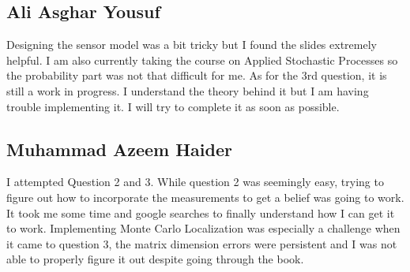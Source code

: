 \documentclass[answers]{exam}
\begin{document}
\begin{questions}
\begin{parts}
\begin{solution}
            \subsection*{Ali Asghar Yousuf}
            Designing the sensor model was a bit tricky but I found the slides extremely
            helpful. I am also currently taking the course on Applied Stochastic Processes
            so the probability part was not that difficult for me. As for the 3rd question,
            it is still a work in progress. I understand the theory behind it but I am
            having trouble implementing it. I will try to complete it as soon as possible.

            \subsection*{Muhammad Azeem Haider}
            I attempted Question 2 and 3. While question 2 was seemingly easy, trying to
            figure out how to incorporate the measurements to get a belief was going to
            work. It took me some time and google searches to finally understand how I can
            get it to work. Implementing Monte Carlo Localization was especially a
            challenge when it came to question 3, the matrix dimension errors were
            persistent and I was not able to properly figure it out despite going through
            the book.

        \end{solution}
    \end{parts}
\end{questions}
\end{document}
